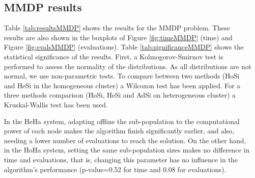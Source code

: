 \subsection{MMDP results}

Table \ref{tab:resultsMMDP} shows the results for the MMDP problem. These results are also shown in the boxplots of Figure \ref{fig:timeMMDP} (time) and Figure \ref{fig:evalsMMDP} (evaluations). Table \ref{tab:significanceMMDP} shows the statistical significance of the results. First, a Kolmogorov-Smirnov test is performed to assess the normality of the distributions. As all distributions are not normal, we use non-parametric tests. To compare between two methods (HoSi and HeSi in the homogeneous cluster) a Wilcoxon test has been applied. For a three methods comparison (HoSi, HeSi and AdSi on heterogeneous cluster) a Kruskal-Wallis test has been used. 

 In the HeHa system, adapting offline the sub-population to the computational
 power of each node makes the algorithm finish significantly earlier,
 and also, needing a lower number of evaluations to reach the solution. On the other hand, in the HoHa system,
 setting the same sub-population sizes makes no difference in time and
 evaluations, that is, changing this parameter has no influence in the
 algorithm's performance (p-value=0.52 for time and 0.08 for evaluations).


\begin{table}
\caption{Results for the MMDP problem}
\label{tab:resultsMMDP}
\end{table}




